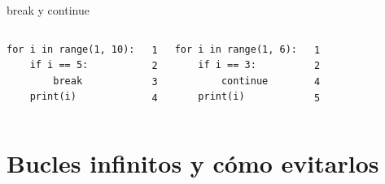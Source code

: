 \documentclass{beamer}
\begin{document}
\begin{frame}[fragile]{break y continue \faStepForward}
\begin{columns}[T]
\begin{lstlisting}
for i in range(1, 10):
    if i == 5:
        break
    print(i)
\end{lstlisting}
\vspace{-0.2cm}
\begin{tcolorbox}[colback=green!10,colframe=green,title={\small\faArrowCircleRight \ Salida},coltitle=fg0,left=3pt,right=3pt,top=2pt,bottom=2pt,boxsep=1pt]
\small\texttt{1\\
2\\
3\\
4}
\end{tcolorbox}

\begin{lstlisting}
for i in range(1, 6):
    if i == 3:
        continue
    print(i)
\end{lstlisting}
\vspace{-0.2cm}
\begin{tcolorbox}[colback=green!10,colframe=green,title={\small\faArrowCircleRight \ Salida},coltitle=fg0,left=3pt,right=3pt,top=2pt,bottom=2pt,boxsep=1pt]
\small\texttt{1\\
2\\
4\\
5}
\end{tcolorbox}
\end{columns}
\end{frame}

\section{Bucles infinitos y cómo evitarlos}
\end{document}
